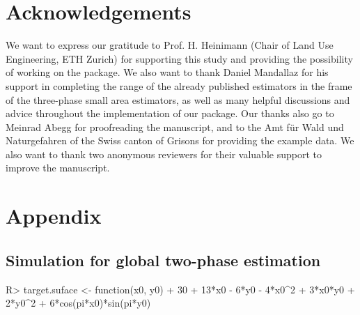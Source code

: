 \documentclass[article]{jss}
\begin{document}


\section*{Acknowledgements}

We want to express our gratitude to Prof. H. Heinimann (Chair of Land Use Engineering, ETH Zurich) for supporting this study and providing the possibility of working on the package. We also want to thank Daniel Mandallaz for his support in completing the range of the already published estimators in the frame of the three-phase small area estimators, as well as many helpful discussions and advice throughout the implementation of our package. Our thanks also go to Meinrad Abegg for proofreading the manuscript, and to the Amt f{\"u}r Wald und Naturgefahren of the Swiss canton of Grisons for providing the example data. We also want to thank two anonymous reviewers for their valuable support to improve the manuscript.

\newpage




    
\section*{Appendix}
\label{sec:appendix}


\subsection*{Simulation for global two-phase estimation}



\begin{Schunk}
\begin{Sinput}
R> target.suface <- function(x0, y0){
+    30 + 13*x0 - 6*y0 - 4*x0^2 + 3*x0*y0 + 2*y0^2 + 6*cos(pi*x0)*sin(pi*y0)}
\end{Sinput}
\end{Schunk}
\end{document}
